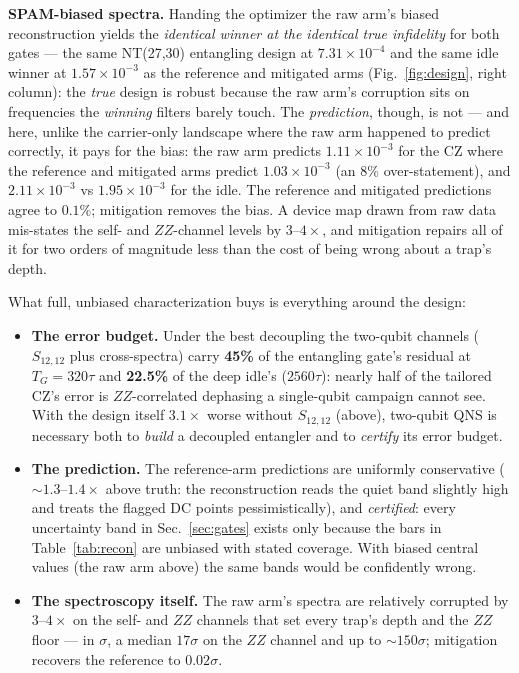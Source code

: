 \documentclass[10pt]{article}
\newcommand{\TG}{T_G}
\begin{document}
\textbf{SPAM-biased spectra.} Handing the optimizer the raw arm's biased
reconstruction yields the \emph{identical winner at the identical true
infidelity} for both gates --- the same NT(27,30) entangling design at
$7.31\times10^{-4}$ and the same idle winner at $1.57\times10^{-3}$ as the
reference and mitigated arms (Fig.~\ref{fig:design}, right column): the
\emph{true} design is robust because the raw arm's corruption sits on
frequencies the \emph{winning} filters barely touch. The \emph{prediction},
though, is not --- and here, unlike the carrier-only landscape where the raw
arm happened to predict correctly, it pays for the bias: the raw arm predicts
$1.11\times10^{-3}$ for the CZ where the reference and mitigated arms predict
$1.03\times10^{-3}$ (an $8\%$ over-statement), and $2.11\times10^{-3}$ vs
$1.95\times10^{-3}$ for the idle. The reference and mitigated predictions
agree to $0.1\%$; mitigation removes the bias. A device map drawn from raw
data mis-states the self- and $ZZ$-channel levels by $3$--$4\times$, and
mitigation repairs all of it for two orders of magnitude less than the cost
of being wrong about a trap's depth.

What full, unbiased characterization buys is everything around the design:

\begin{itemize}[leftmargin=1.4em, itemsep=0.1em, topsep=0.2em]
\item \textbf{The error budget.} Under the best decoupling the two-qubit
channels ($S_{12,12}$ plus cross-spectra) carry \textbf{45\%} of the
entangling gate's residual at $\TG = 320\tau$ and \textbf{22.5\%} of the
deep idle's ($2560\tau$): nearly half of the tailored CZ's error is
$ZZ$-correlated dephasing a single-qubit campaign cannot see. With the
design itself $3.1\times$ worse without $S_{12,12}$ (above), two-qubit QNS
is necessary both to \emph{build} a decoupled entangler and to
\emph{certify} its error budget.
\item \textbf{The prediction.} The reference-arm predictions are uniformly
conservative ($\sim 1.3$--$1.4\times$ above truth: the reconstruction reads
the quiet band slightly high and treats the flagged DC points
pessimistically), and \emph{certified}: every uncertainty band in
Sec.~\ref{sec:gates} exists only because the bars in Table~\ref{tab:recon}
are unbiased with stated coverage. With biased central values (the raw arm
above) the same bands would be confidently wrong.
\item \textbf{The spectroscopy itself.} The raw arm's spectra are relatively
corrupted by $3$--$4\times$ on the self- and $ZZ$ channels that set every
trap's depth and the $ZZ$ floor --- in $\sigma$, a median $17\sigma$ on the
$ZZ$ channel and up to $\sim 150\sigma$; mitigation recovers the reference to
$0.02\sigma$.
\end{itemize}
\end{document}
